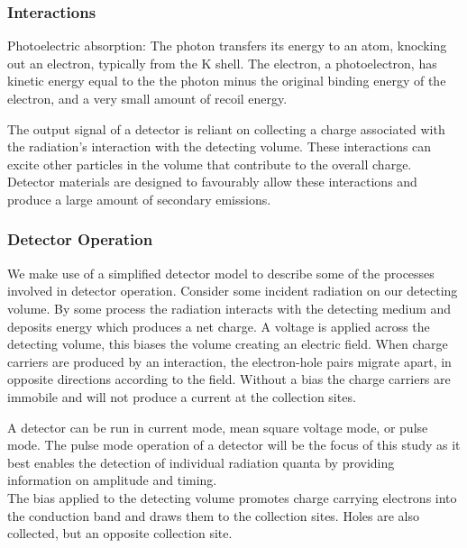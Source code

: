 \documentclass[12pt]{article}
\begin{document}
\begin{doublespacing}
\subsubsection{Interactions}
Photoelectric absorption: The photon transfers its energy to an atom, knocking out an electron, typically from the K shell. 
The electron, a photoelectron, has kinetic energy equal to the the photon minus the original binding energy of the electron, and a very small amount of recoil energy.

The output signal of a detector is reliant on collecting a charge associated with the radiation's interaction with the detecting volume. 
These interactions can excite other particles in the volume that contribute to the overall charge.
Detector materials are designed to favourably allow these interactions and produce a large amount of secondary emissions. 
\\


\subsubsection{Detector Operation}
We make use of a simplified detector model to describe some of the processes involved in detector operation.
Consider some incident radiation on our detecting volume. 
By some process the radiation interacts with the detecting medium and deposits energy which produces a net charge. 
A voltage is applied across the detecting volume, this biases the volume creating an electric field. 
When charge carriers are produced by an interaction, the electron-hole pairs migrate apart, in opposite directions according to the field. 
Without a bias the charge carriers are immobile and will not produce a current at the collection sites.

A detector can be run in current mode, mean square voltage mode, or pulse mode. 
The pulse mode operation of a detector will be the focus of this study as it best enables the detection of individual radiation quanta by providing information on amplitude and timing.
\\

The bias applied to the detecting volume promotes charge carrying electrons into the conduction band and draws them to the collection sites. 
Holes are also collected, but an opposite collection site.
\\


\end{doublespacing}
\end{document}

